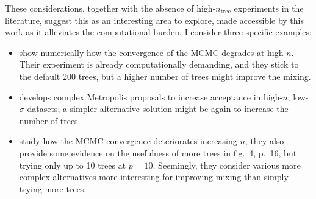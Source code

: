 \documentclass{article}
\begin{document}
    These considerations, together with the absence of high-$n_\text{tree}$ experiments in the literature, suggest this as an interesting area to explore, made accessible by this work as it alleviates the computational burden. I consider three specific examples:

    \begin{itemize}

        \item \citet[\S4.1]{ronen2022} show numerically how the convergence of the MCMC degrades at high $n$. Their experiment is already computationally demanding, and they stick to the default 200 trees, but a higher number of trees might improve the mixing.

        \item \citet{pratola2016} develops complex Metropolis proposals to increase acceptance in high-$n$, low-$\sigma$ datasets; a simpler alternative solution might be again to increase the number of trees.

        \item \citet{tan2024} study how the MCMC convergence deteriorates increasing $n$; they also provide some evidence on the usefulness of more trees in fig.~4, p.~16, but trying only up to 10 trees at $p=10$. Seemingly, they consider various more complex alternatives more interesting for improving mixing than simply trying more trees.

    \end{itemize}

\end{document}
